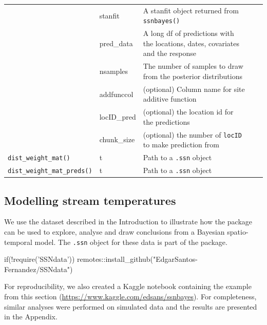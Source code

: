 \begin{table}[h]
{\begin{tabular}{lllll}
         & stanfit       & A stanfit object returned from \texttt{ssnbayes()}                                                                   &  &  \\
         & pred\_data    & A long df of predictions with the locations, dates, covariates and the response  &  &  \\
         & nsamples      & The number of samples to draw from the posterior distributions                                            &  &  \\
         & addfunccol    & (optional) Column name for site additive function                                                                  &  &  \\
         & locID\_pred   & (optional) the location id for the predictions                                                            &  &  \\
         & chunk\_size   & (optional) the number of \texttt{locID} to make prediction from                                                    &  &  \\ \hline
\texttt{dist\_weight\_mat()} & t             & Path to a \texttt{.ssn} object    &  &  \\ 
\texttt{dist\_weight\_mat\_preds()} & t             & Path to a \texttt{.ssn} object    &  &  \\ \hline
\end{tabular}
}
\end{table}



\subsection{Modelling stream temperatures}
\label{sec:app}

We use the dataset described in the Introduction to illustrate how the  package can be used to explore, analyse and draw conclusions from a Bayesian spatio-temporal model. The \texttt{.ssn} object for these data is part of the  package.


\begin{example}
if(!require('SSNdata')) remotes::install_github("EdgarSantos-Fernandez/SSNdata")
\end{example}
For reproducibility, we also created a Kaggle notebook containing the example from this section (\url{https://www.kaggle.com/edsans/ssnbayes}). For completeness, similar analyses were performed on simulated data and the results are presented in the Appendix. 


